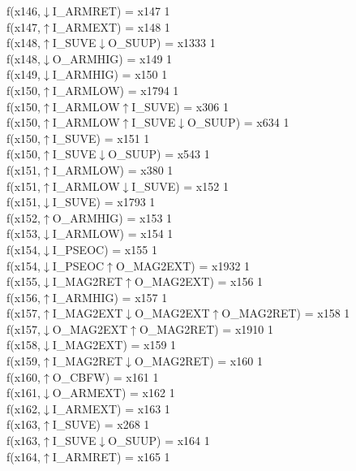 f(x146,$\downarrow$I\_ARMRET) = x147 {1} \\
f(x147,$\uparrow$I\_ARMEXT) = x148 {1} \\
f(x148,$\uparrow$I\_SUVE$\downarrow$O\_SUUP) = x1333 {1} \\
f(x148,$\downarrow$O\_ARMHIG) = x149 {1} \\
f(x149,$\downarrow$I\_ARMHIG) = x150 {1} \\
f(x150,$\uparrow$I\_ARMLOW) = x1794 {1} \\
f(x150,$\uparrow$I\_ARMLOW$\uparrow$I\_SUVE) = x306 {1} \\
f(x150,$\uparrow$I\_ARMLOW$\uparrow$I\_SUVE$\downarrow$O\_SUUP) = x634 {1} \\
f(x150,$\uparrow$I\_SUVE) = x151 {1} \\
f(x150,$\uparrow$I\_SUVE$\downarrow$O\_SUUP) = x543 {1} \\
f(x151,$\uparrow$I\_ARMLOW) = x380 {1} \\
f(x151,$\uparrow$I\_ARMLOW$\downarrow$I\_SUVE) = x152 {1} \\
f(x151,$\downarrow$I\_SUVE) = x1793 {1} \\
f(x152,$\uparrow$O\_ARMHIG) = x153 {1} \\
f(x153,$\downarrow$I\_ARMLOW) = x154 {1} \\
f(x154,$\downarrow$I\_PSEOC) = x155 {1} \\
f(x154,$\downarrow$I\_PSEOC$\uparrow$O\_MAG2EXT) = x1932 {1} \\
f(x155,$\downarrow$I\_MAG2RET$\uparrow$O\_MAG2EXT) = x156 {1} \\
f(x156,$\uparrow$I\_ARMHIG) = x157 {1} \\
f(x157,$\uparrow$I\_MAG2EXT$\downarrow$O\_MAG2EXT$\uparrow$O\_MAG2RET) = x158 {1} \\
f(x157,$\downarrow$O\_MAG2EXT$\uparrow$O\_MAG2RET) = x1910 {1} \\
f(x158,$\downarrow$I\_MAG2EXT) = x159 {1} \\
f(x159,$\uparrow$I\_MAG2RET$\downarrow$O\_MAG2RET) = x160 {1} \\
f(x160,$\uparrow$O\_CBFW) = x161 {1} \\
f(x161,$\downarrow$O\_ARMEXT) = x162 {1} \\
f(x162,$\downarrow$I\_ARMEXT) = x163 {1} \\
f(x163,$\uparrow$I\_SUVE) = x268 {1} \\
f(x163,$\uparrow$I\_SUVE$\downarrow$O\_SUUP) = x164 {1} \\
f(x164,$\uparrow$I\_ARMRET) = x165 {1} \\
